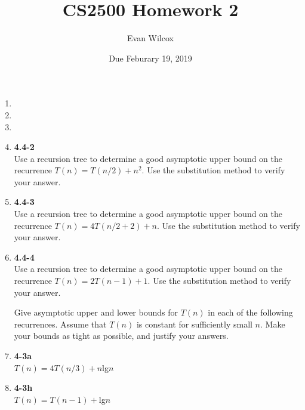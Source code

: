 \documentclass[a4paper]{article}
\title{CS2500 Homework 2}
\author{Evan Wilcox}
\date{Due Feburary 19, 2019}
\begin{document}
    \maketitle

    \begin{enumerate}

        \item 



        \item



        \item



        \newpage
        \item
        \textbf{4.4-2} \\
        Use a recursion tree to determine a good asymptotic upper bound on the 
        recurrence $T(n) = T(n/2) + n^{2}$. Use the substitution method to verify 
        your answer.


        \newpage
        \item
        \textbf{4.4-3} \\
        Use a recursion tree to determine a good asymptotic upper bound on the 
        recurrence $T(n) = 4T(n/2 + 2) + n$. Use the substitution method to verify 
        your answer.

        \newpage
        \item
        \textbf{4.4-4} \\
        Use a recursion tree to determine a good asymptotic upper bound on the 
        recurrence $T(n) = 2T(n-1) + 1$. Use the substitution method to verify 
        your answer.

        \newpage
        Give asymptotic upper and lower bounds for $T(n)$ in each of the following 
        recurrences. Assume that $T(n)$ is constant for sufficiently small $n$. Make 
        your bounds as tight as possible, and justify your answers. 
        \item
        
        \textbf{4-3a} \\
        $T(n) = 4T(n/3) + n$lg$n$


        \item 
        \textbf{4-3h} \\
        $T(n) = T(n-1) + $lg$n$


    \end{enumerate}
\end{document}
